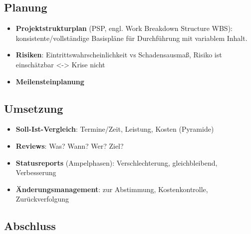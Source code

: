 \documentclass{article}
\begin{document}
\subsection{Planung}
\begin{itemize}
  \item \textbf{Projektstrukturplan} (PSP, engl. Work Breakdown Structure WBS): konsistente/vollständige Basispläne für Durchführung mit variablem Inhalt.
  \item \textbf{Risiken}: Eintrittswahrscheinlichkeit vs Schadensausmaß, Risiko ist einschätzbar <-> Krise nicht
  \item \textbf{Meilensteinplanung}
\end{itemize}

\subsection{Umsetzung}
\begin{itemize}
  \item \textbf{Soll-Ist-Vergleich}: Termine/Zeit, Leistung, Kosten (Pyramide)
  \item \textbf{Reviews}: Was? Wann? Wer? Ziel?
  \item \textbf{Statusreports} (Ampelphasen): Verschlechterung, gleichbleibend, Verbesserung
  \item \textbf{Änderungsmanagement}: zur Abstimmung, Kostenkontrolle, Zurückverfolgung
\end{itemize}

\subsection{Abschluss}
\end{document}

